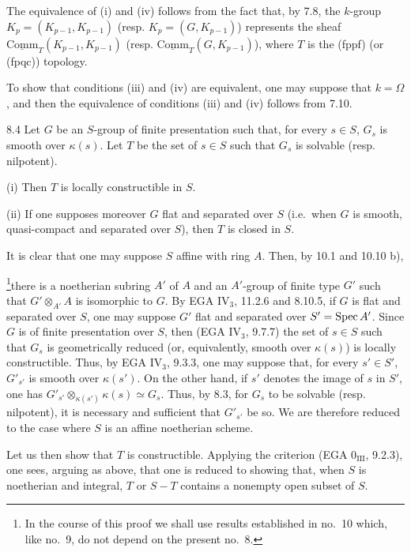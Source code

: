 The equivalence of (i) and (iv) follows from the fact that, by 7.8, the $k$-group $K_p=(K_{p-1},K_{p-1})$ (resp. $K_p=(G,K_{p-1})$) represents the sheaf $\underline{\mathrm{Comm}}_T(K_{p-1},K_{p-1})$ (resp. $\underline{\mathrm{Comm}}_T(G,K_{p-1})$), where $T$ is the (fppf) (or (fpqc)) topology.

To show that conditions (iii) and (iv) are equivalent, one may suppose that $k=\Omega$, and then the equivalence of conditions (iii) and (iv) follows from 7.10.

\begin{proposition}{8.4}\label{VIB.8.4}
Let $G$ be an $S$-group of finite presentation such that, for every $s\in S$, $G_s$ is smooth over $\kappa(s)$. Let $T$ be the set of $s\in S$ such that $G_s$ is solvable (resp. nilpotent).

(i) Then $T$ is locally constructible in $S$.

(ii) If one supposes moreover $G$ flat and separated over $S$ (i.e.\ when $G$ is smooth, quasi-compact and separated over $S$), then $T$ is closed in $S$.
\end{proposition}
It is clear that one may suppose $S$ affine with ring $A$. Then, by 10.1 and 10.10 b),\begingroup\renewcommand{\thefootnote}{*}\addtocounter{footnote}{-1}\footnote{In the course of this proof we shall use results established in no.\ 10 which, like no.\ 9, do not depend on the present no.\ 8.}\endgroup there is a noetherian subring $A'$ of $A$ and an $A'$-group of finite type $G'$ such that $G'\otimes_{A'}A$ is isomorphic to $G$. By EGA IV$_3$, 11.2.6 and 8.10.5, if $G$ is flat and separated over $S$, one may suppose $G'$ flat and separated over $S'=\operatorname{Spec} A'$. Since $G$ is of finite presentation over $S$, then (EGA IV$_3$, 9.7.7) the set of $s\in S$ such that $G_s$ is geometrically reduced (or, equivalently, smooth over $\kappa(s)$) is locally constructible. Thus, by EGA IV$_3$, 9.3.3, one may suppose that, for every $s'\in S'$, $G'_{s'}$ is smooth over $\kappa(s')$. On the other hand, if $s'$ denotes the image of $s$ in $S'$, one has $G'_{s'}\otimes_{\kappa(s')}\kappa(s)\simeq G_s$. Thus, by 8.3, for $G_s$ to be solvable (resp. nilpotent), it is necessary and sufficient that $G'_{s'}$ be so. We are therefore reduced to the case where $S$ is an affine noetherian scheme.

Let us then show that $T$ is constructible. Applying the criterion (EGA 0$_{\mathrm{III}}$, 9.2.3), one sees, arguing as above, that one is reduced to showing that, when $S$ is noetherian and integral, $T$ or $S-T$ contains a nonempty open subset of $S$.


